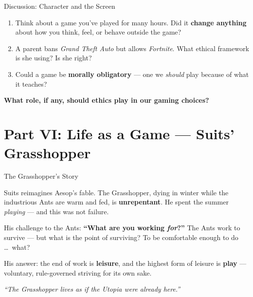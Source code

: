 \documentclass[aspectratio=169,11pt]{beamer}
\begin{document}
\begin{frame}{Discussion: Character and the Screen}
\begin{discussionbox}[Discussion]
\footnotesize
\begin{enumerate}
    \item Think about a game you've played for many hours. Did it \textbf{change anything} about how you think, feel, or behave outside the game?
    \item A parent bans \emph{Grand Theft Auto} but allows \emph{Fortnite}. What ethical framework is she using? Is she right?
    \item Could a game be \textbf{morally obligatory} --- one we \emph{should} play because of what it teaches?
\end{enumerate}
\textbf{What role, if any, should ethics play in our gaming choices?}
\end{discussionbox}
\end{frame}

\section{Part VI: Life as a Game --- Suits' Grasshopper}

\begin{frame}[t]{The Grasshopper's Story}
\begin{casestudybox}
\footnotesize
Suits reimagines Aesop's fable. The Grasshopper, dying in winter while the industrious Ants are warm and fed, is \textbf{unrepentant}. He spent the summer \emph{playing} --- and this was not failure.

\vspace{0.1cm}
His challenge to the Ants: \textbf{``What are you working \emph{for}?''} The Ants work to survive --- but what is the point of surviving? To be comfortable enough to do \ldots\ what?

\vspace{0.1cm}
His answer: the end of work is \textbf{leisure}, and the highest form of leisure is \textbf{play} --- voluntary, rule-governed striving for its own sake.
\end{casestudybox}

\vspace{0.15cm}
\begin{quotebox}[Suits]
\footnotesize
\emph{``The Grasshopper lives as if the Utopia were already here.''}
\end{quotebox}
\end{frame}
\end{document}
